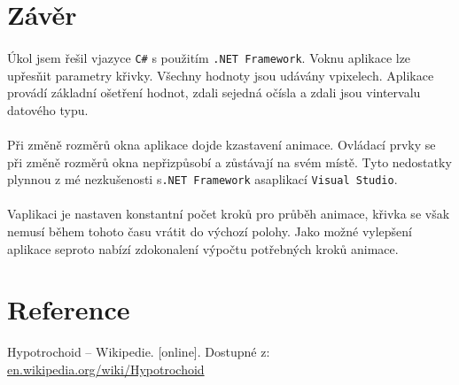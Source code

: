 \documentclass[12pt]{scrartcl}
\begin{document}
\newpage
\section{Závěr}
\paragraph{}
Úkol jsem řešil v\nobreakspace jazyce \texttt{C\#} s použitím \texttt{.NET Framework}.
V\nobreakspace oknu aplikace lze upřesňit parametry křivky. Všechny hodnoty jsou udávány v\nobreakspace pixelech. Aplikace provádí základní ošetření hodnot, zdali se\nobreakspace jedná o\nobreakspace čísla a zdali jsou v\nobreakspace intervalu datového typu.

\paragraph{}
Při změně rozměrů okna aplikace dojde k\nobreakspace zastavení animace. Ovládací prvky se při změně rozměrů okna nepřizpůsobí a zůstávají na svém místě. Tyto nedostatky plynnou z mé nezkušenosti s\nobreakspace \texttt{.NET Framework} a\nobreakspace s\nobreakspace aplikací  \texttt{Visual Studio}.

\paragraph{}
V\nobreakspace aplikaci je nastaven konstantní počet kroků pro průběh animace, křivka se však nemusí během tohoto času vrátit do výchozí polohy. Jako možné vylepšení aplikace se\nobreakspace proto nabízí zdokonalení výpočtu potřebných kroků animace.

\section{Reference}

Hypotrochoid – Wikipedie. [online]. Dostupné z: \href{https://en.wikipedia.org/wiki/Hypotrochoid}{en.wikipedia.org/wiki/Hypotrochoid}
\end{document}
